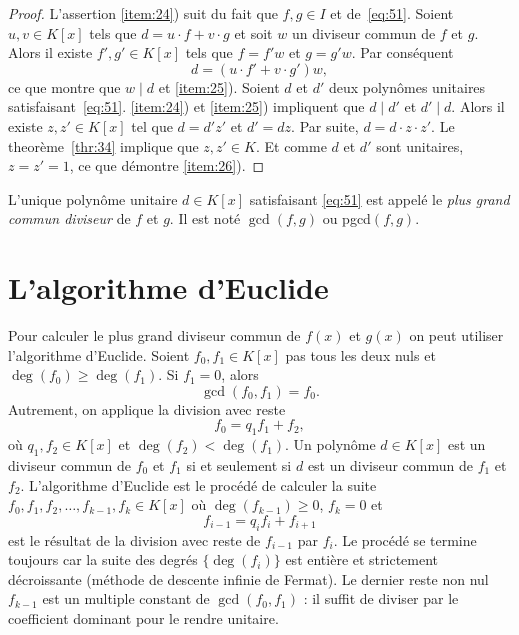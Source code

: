 \begin{proof}
  L'assertion \ref{item:24}) suit du fait que $f,g ∈ I$ et de~\eqref{eq:51}. Soient $u,v ∈K[x]$  tels que
  $    d = u⋅f  + v ⋅ g $
  et soit $w$ un diviseur commun de $f$ et $g$. Alors il existe $f',g' ∈K[x]$ tels que  $f = f' w$ et $g = g' w$. Par conséquent
  \begin{displaymath}
    d = (u⋅f'  + v ⋅ g') w,
  \end{displaymath}
  ce que montre que $w \mid d$ et \ref{item:25}). 
  Soient $d$ et $d'$ deux polynômes unitaires satisfaisant~\eqref{eq:51}. \ref{item:24}) et \ref{item:25}) impliquent que $d \mid d'$ et $d' \mid d$.
  Alors il existe $z,z' ∈K[x]$ tel que $d = d' z'$ et $d' = dz$. Par suite, $d = d ⋅z ⋅ z'$. Le theorème~\ref{thr:34} implique que $z,z' ∈ K$. Et comme $d$ et $d'$ sont unitaires, $z=z'=1$, ce que démontre \ref{item:26}). 
\end{proof}

\begin{definition}
  \label{def:56}
  L'unique polynôme unitaire $d ∈ K[x]$ satisfaisant \eqref{eq:51} est appelé  le \emph{plus grand commun diviseur} de $f$ et $g$. Il est noté $\gcd(f,g)$ ou pgcd$(f,g)$.
\end{definition}

\section{L'algorithme d'Euclide}
\label{sec:lalg-de-eucl}



Pour calculer le plus grand diviseur commun de $f(x)$ et $g(x)$  on peut utiliser l'algorithme d'Euclide. Soient $f_0,f_1 ∈K[x]$ pas tous les deux nuls et $\deg(f_0) ≥ \deg(f_1)$. Si $f_1 = 0$, alors
\begin{displaymath}
\gcd(f_0,f_1) =   f_0. 
\end{displaymath}
Autrement, on applique la division avec reste
\begin{displaymath}
  f_0 = q_1 f_1 + f_2, 
\end{displaymath}
où $q_1,f_2 ∈K[x]$ et $ \deg(f_2)< \deg(f_1)$. Un polynôme  $d ∈K[x]$ est un diviseur commun de $f_0$ et $f_1$ si et seulement si $d$ est un diviseur commun de $f_1$ et $f_2$. L'algorithme d'Euclide est le procédé de calculer la suite $f_0,f_1,f_2,\dots,f_{k-1},f_k ∈K[x]$  où $\deg(f_{k-1})≥0$, $f_k=0$ et 
\begin{displaymath}
  f_{i-1} = q_i f_i + f_{i+1} 
\end{displaymath}
est le résultat de la division avec reste de $f_{i-1} $ par $f_i$. Le procédé se termine toujours car la suite des degrés $\{\deg(f_i)\}$ est entière et strictement décroissante (méthode de descente infinie de Fermat). Le dernier reste non nul $f_{k-1}$ est un multiple constant de $\gcd(f_0,f_1)$ : il suffit de diviser par le coefficient dominant pour le rendre unitaire.

